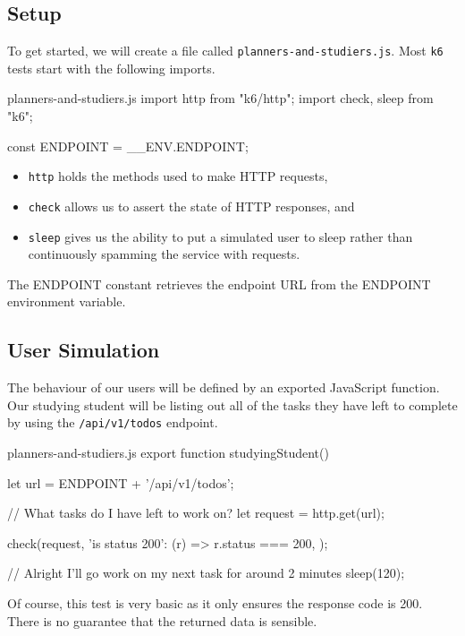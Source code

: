\documentclass{csse4400}
\begin{document}
\subsection{Setup}
To get started,
we will create a file called \texttt{planners-and-studiers.js}.
Most \texttt{k6} tests start with the following imports.
%
\begin{code}[language=JavaScript,numbers=none]{planners-and-studiers.js}
import http from "k6/http";
import { check, sleep } from "k6";

const ENDPOINT = __ENV.ENDPOINT;
\end{code}

\begin{itemize}
    \item \texttt{http} holds the methods used to make HTTP requests,
    \item \texttt{check} allows us to assert the state of HTTP responses, and
    \item \texttt{sleep} gives us the ability to put a simulated user to sleep rather than continuously spamming the service with requests.
\end{itemize}

The ENDPOINT constant retrieves the endpoint URL from the ENDPOINT environment variable.

\subsection{User Simulation}

The behaviour of our users will be defined by an exported JavaScript function.
Our studying student will be listing out all of the tasks they have left to complete by using the
\texttt{/api/v1/todos} endpoint.
%
\begin{code}[language=JavaScript,numbers=none]{planners-and-studiers.js}
export function studyingStudent() {
    let url = ENDPOINT + '/api/v1/todos';

    // What tasks do I have left to work on?
    let request = http.get(url);

    check(request, {
        'is status 200': (r) => r.status === 200,
    });
    
    // Alright I'll go work on my next task for around 2 minutes
    sleep(120);
}
\end{code}

Of course,
this test is very basic as it only ensures the response code is 200.
There is no guarantee that the returned data is sensible.
\end{document}
